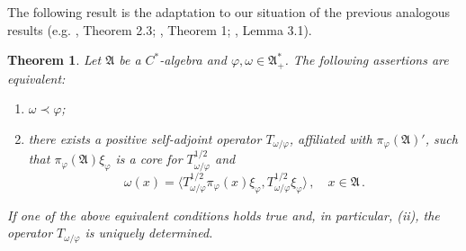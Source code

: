 \documentclass[12pt]{amsart}
\numberwithin{equation}{section}
\def\ga{{\mathfrak A}} \def\gpa{{\mathfrak a}}
\def\f{\varphi}\def\ff{\phi} \def\F{\Phi}
\def\om{\omega} \def\Om{\Omega}
\newtheorem{thm}{Theorem}[section]
\begin{document}
The following result is the adaptation to our situation of the previous analogous results (e.g. \cite{N}, Theorem 2.3; \cite{G}, Theorem 1; \cite{Hi}, Lemma 3.1).
\begin{thm}
\label{main}
Let $\ga$ be a $C^*$-algebra and $\f,\om\in\ga^*_+$. The following assertions are equivalent:
\begin{enumerate} 
\item[(i)] $\om\prec\f$;
\item[(ii)] there exists a positive self-adjoint operator $T_{\om/\f}$, affiliated with $\pi_\f(\ga)'$, such that 
$\pi_\f(\ga)\xi_\f$ is a core for $T_{\om/\f}^{1/2}$ and
$$
\om(x)=\big\langle T_{\om/\f}^{1/2}\pi_\f(x)\xi_\f,T_{\om/\f}^{1/2}\xi_\f\big\rangle\,,\quad x\in\ga\,.
$$
\end{enumerate}
If one of the above equivalent conditions holds true and, in particular, (ii), the operator $T_{\om/\f}$ is uniquely determined.
\end{thm}
\end{document}
